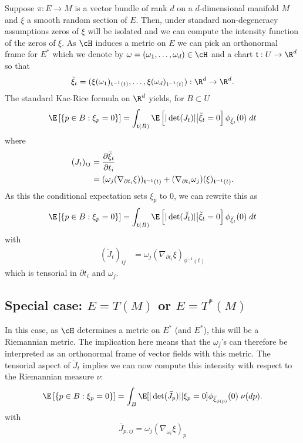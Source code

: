 \documentclass{article}
\begin{document}
Suppose $\pi:E \to M$ is a vector bundle of rank $d$ on a $d$-dimensional manifold $M$ and $\xi$
a smooth random section of $E$. Then, under standard non-degeneracy assumptions zeros of $\xi$ will be isolated
and we can compute the intensity function of the zeros of $\xi$. As $\cH$ induces a metric on $E$ we can pick
an orthonormal frame for $E^*$ which we denote by $\omega=(\omega_1, \dots, \omega_d) \in \cH$ and a chart
$\coordchart:U \to \R^d$ so that
$$
\breve{\xi}_t = (\xi(\omega_1)_{\coordchart^{-1}(t)}, \dots, \xi(\omega_d)_{\coordchart^{-1}(t)}): \R^d \to \R^d.
$$
The standard Kac-Rice formula on $\R^d$ yields, for $B \subset U$
$$
\begin{aligned}
\E \left[\{p \in B: \xi_p=0\} \right] &= \int_{\coordchart(B)} \E\left[|\det(J_t)| \bigr | \breve{\xi}_t=0 \right] \phi_{\breve{\xi}_t}(0) \; dt \\
\end{aligned}
$$
where
$$
\begin{aligned}
  (J_t)_{ij} &= \frac{\partial \breve{\xi}_t}{\partial t_i} \\
  &= (\omega_j(\nabla_{\partial t_i}\xi))_{\mathfrak{t}^{-1}(t)} + (\nabla_{\partial t_i} \omega_j)(\xi)_{\mathfrak{t}^{-1}(t)}. \\
\end{aligned}
$$
As this the conditional expectation sets $\xi_p$ to 0, we can rewrite this as
$$
\begin{aligned}
\E \left[\{p \in B: \xi_p=0\} \right] &= \int_{\coordchart(B)} \E \left[|\det(\breve{J}_t)| \bigr | \breve{\xi}_t=0 \right] \phi_{\breve{\xi}_t}(0) \; dt \\
\end{aligned}
$$
with
$$
\begin{aligned}
  (\breve{J}_t)_{ij} &= \omega_j(\nabla_{\partial t_i}\xi)_{\phi^{-1}(t)}
\end{aligned}
$$
which is tensorial in $\partial t_i$ and $\omega_j$.

\subsection{Special case: $E=T(M)$ or $E=T^*(M)$}

In this case, as $\cH$ determines a metric on $E^*$ (and $E^*$), this will be a Riemannian metric. The implication
here means that the $\omega_j$'s can therefore be interpreted as an orthonormal frame of vector fields with
this metric. The tensorial aspect of $\breve{J}_t$ implies we can now compute this intensity
with respect to the Riemannian measure $\nu$:
$$
\begin{aligned}
\E \left[\{p \in B: \xi_p=0\} \right] &= \int_{B} \E[|\det(\bar{J}_p)| | \xi_p=0] \phi_{\breve{\xi}_{\phi(p)}}(0) \; \nu(dp). \\
\end{aligned}
$$
with
\begin{equation}
  \label{eq:jacobian}
\bar{J}_{p,ij} =  \omega_j(\nabla_{\omega_i}\xi)_{p}
\end{equation}
\end{document}
